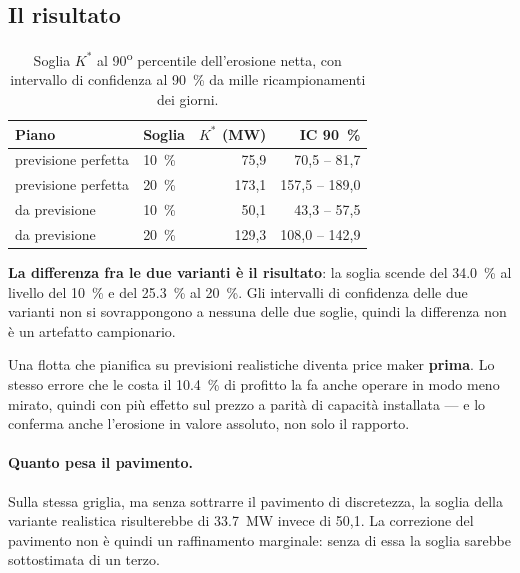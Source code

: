 \subsection{Il risultato}

\begin{table}[H]
\centering
\caption{Soglia $K^*$ al 90\textsuperscript{o} percentile dell'erosione netta, con intervallo
di confidenza al \SI{90}{\percent} da mille ricampionamenti dei giorni.}
\label{tab:soglia}
\begin{tabular}{@{}llrr@{}}
\toprule
\textbf{Piano} & \textbf{Soglia} & \textbf{$K^*$ (MW)} & \textbf{IC \SI{90}{\percent}} \\
\midrule
previsione perfetta  & \SI{10}{\percent} & 75,9  & 70,5 -- 81,7 \\
previsione perfetta  & \SI{20}{\percent} & 173,1 & 157,5 -- 189,0 \\
da previsione        & \SI{10}{\percent} & 50,1  & 43,3 -- 57,5 \\
da previsione        & \SI{20}{\percent} & 129,3 & 108,0 -- 142,9 \\
\bottomrule
\end{tabular}
\end{table}

\textbf{La differenza fra le due varianti \`e il risultato}: la soglia scende del
\SI{34,0}{\percent} al livello del \SI{10}{\percent} e del \SI{25,3}{\percent} al
\SI{20}{\percent}. Gli intervalli di confidenza delle due varianti non si sovrappongono a
nessuna delle due soglie, quindi la differenza non \`e un artefatto campionario.

Una flotta che pianifica su previsioni realistiche diventa price maker \textbf{prima}. Lo
stesso errore che le costa il \SI{10,4}{\percent} di profitto la fa anche operare in modo meno
mirato, quindi con pi\`u effetto sul prezzo a parit\`a di capacit\`a installata --- e lo
conferma anche l'erosione in valore assoluto, non solo il rapporto.

\paragraph{Quanto pesa il pavimento.} Sulla stessa griglia, ma senza sottrarre il pavimento di
discretezza, la soglia della variante realistica risulterebbe di \SI{33,7}{MW} invece di
50,1. La correzione del pavimento non \`e quindi un raffinamento marginale: senza di
essa la soglia sarebbe sottostimata di un terzo.

